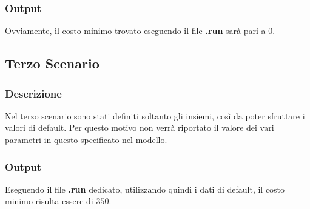 \subsubsection{Output}
Ovviamente, il costo minimo trovato eseguendo il file \textbf{.run} sarà pari a \texteuro$0$.

\subsection{Terzo Scenario}
\subsubsection{Descrizione}
Nel terzo scenario sono stati definiti soltanto gli insiemi, così da poter sfruttare i valori di default. Per questo motivo non verrà riportato il valore dei vari parametri in questo specificato nel modello.
\subsubsection{Output}
Eseguendo il file \textbf{.run} dedicato, utilizzando quindi i dati di default, il costo minimo risulta essere di \texteuro$350$.